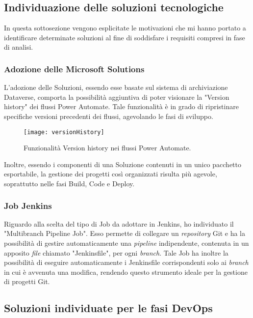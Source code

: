 \subsection{Individuazione delle soluzioni tecnologiche}
In questa sottosezione vengono esplicitate le motivazioni che mi hanno portato a identificare determinate soluzioni al fine di soddisfare i requisiti compresi in fase di analisi.

\subsubsection*{Adozione delle Microsoft Solutions}
\label{progettazioneSolutions}
L'adozione delle Soluzioni, essendo esse basate sul sistema di archiviazione Dataverse, comporta la possibilità aggiuntiva di poter visionare la "Version history" dei flussi Power Automate. Tale funzionalità è in grado di ripristinare specifiche versioni precedenti dei flussi, agevolando le fasi di sviluppo.
\begin{figure}[htbp] 
    \centering 
    \texttt{[image: versionHistory]} 
    \caption{Funzionalità Version history nei flussi Power Automate.}
    \label{fig:versionHistory}
\end{figure}
\newline \noindent Inoltre, essendo i componenti di una Soluzione contenuti in un unico pacchetto esportabile, la gestione dei progetti così organizzati risulta più agevole, soprattutto nelle fasi Build, Code e Deploy. 

\subsubsection*{Job Jenkins}
Riguardo alla scelta del tipo di Job da adottare in Jenkins, ho individuato il "Multibranch Pipeline Job".
Esso permette di collegare un \emph{repository} Git e ha la possibilità di gestire automaticamente una \emph{pipeline} indipendente, contenuta in un apposito \emph{file} chiamato "Jenkinsfile", per ogni \emph{branch}.
Tale Job ha inoltre la possibilità di eseguire automaticamente i Jenkinsfile corrispondenti solo ai \emph{branch} in cui è avvenuta una modifica, rendendo questo strumento ideale per la gestione di progetti Git.\\

\subsection{Soluzioni individuate per le fasi DevOps}
